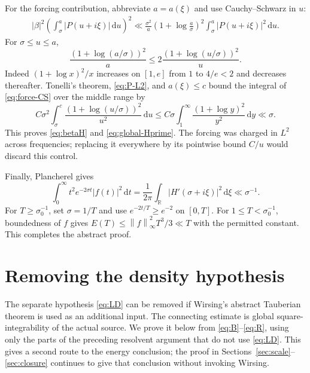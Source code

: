 \documentclass[11pt,letterpaper]{article}
\numberwithin{equation}{section}
\theoremstyle{definition}
\theoremstyle{remark}
\newcommand{\R}{\mathbb R}
\newcommand{\dd}{\,\mathrm d}
\newcommand{\norm}[1]{\left\lVert#1\right\rVert}
\begin{document}
For the forcing contribution, abbreviate $a=a(\xi)$ and use
Cauchy--Schwarz in $u$:
\begin{align}
 |\beta|^2\left(\int_\sigma^a|P(u+i\xi)|\dd u\right)^2
 \ll\frac{\sigma^2}{a}\left(1+\log\frac a\sigma\right)^2
                \int_\sigma^a|P(u+i\xi)|^2\dd u.\label{eq:force-CS}
\end{align}
For $\sigma\le u\le a$,
\begin{equation}\label{eq:weight-comparison}
 \frac{(1+\log(a/\sigma))^2}{a}
 \le2\frac{(1+\log(u/\sigma))^2}{u}.
\end{equation}
Indeed $(1+\log x)^2/x$ increases on $[1,e]$ from $1$ to $4/e<2$ and
decreases thereafter. Tonelli's theorem, \eqref{eq:P-L2}, and $a(\xi)\le c$
bound the integral of \eqref{eq:force-CS} over the middle range by
\[
 C\sigma^2\int_\sigma^c\frac{(1+\log(u/\sigma))^2}{u^2}\dd u
 \le C\sigma\int_1^\infty\frac{(1+\log y)^2}{y^2}\dd y\ll\sigma.
\]
This proves \eqref{eq:betaH} and \eqref{eq:global-Hprime}. The forcing was
charged in $L^2$ across frequencies; replacing it everywhere by its pointwise
bound $C/u$ would discard this control.

Finally, Plancherel gives
\[
 \int_0^\infty t^2e^{-2\sigma t}|f(t)|^2\dd t
 =\frac1{2\pi}\int_\R|H'(\sigma+i\xi)|^2\dd\xi\ll\sigma^{-1}.
\]
For $T\ge\sigma_0^{-1}$, set $\sigma=1/T$ and use $e^{-2t/T}\ge e^{-2}$
on $[0,T]$. For $1\le T<\sigma_0^{-1}$, boundedness of $f$ gives
$E(T)\le\norm f_\infty^2T^3/3\ll T$ with the permitted constant.
This completes the abstract proof.

\section{Removing the density hypothesis}\label{sec:wirsing-bridge}

The separate hypothesis \eqref{eq:LD} can be removed if Wirsing's abstract
Tauberian theorem is used as an additional input. The connecting estimate
is global square-integrability of the actual source. We prove it below
from \eqref{eq:B}--\eqref{eq:R}, using only the parts of the preceding
resolvent argument that do not use \eqref{eq:LD}. This gives a second route
to the energy conclusion; the proof in Sections~\ref{sec:scale}--\ref{sec:closure}
continues to give that conclusion without invoking Wirsing.
\end{document}
